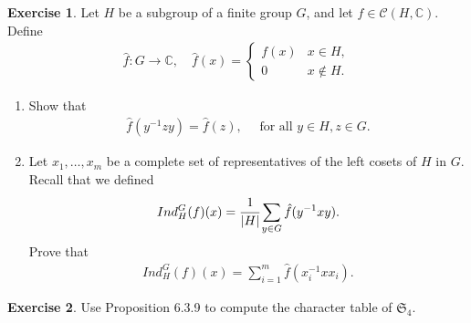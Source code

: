 \documentclass[8pt]{extarticle}
\newcommand{\abs}[1]{|#1|}
\newcommand{\C}{\mathbb{C}}
\newcommand{\<}{\langle}
\renewcommand{\>}{\rangle}
\theoremstyle{definition}
\newtheorem{exercise}{Exercise}
\begin{document}
\begin{exercise}
  Let $H$ be a subgroup of a finite group $G$, and let $f \in \mathcal{C}(H,\C)$. Define
  \begin{align*}
    \hat f : G \to \C, \quad \hat f (x) = 
    \begin{cases}
      f(x) & x \in H, \\
      0 & x \not \in H. 
    \end{cases}
  \end{align*}
  \begin{enumerate}
  \item
    Show that
    \begin{align*}
      \hat f (y^{-1} z y) = \hat f (z), \quad \text{ for all } y \in H, z \in G. 
    \end{align*}
  \item
    Let $x_1, \dots, x_m$ be a complete set of representatives of the left cosets of $H$ in $G$. Recall that we defined
    \begin{align*}
      Ind_H^G(f)(x) = \cfrac{1}{\abs{H}} \sum\limits_{y \in G} \hat f (y^{-1}xy).
    \end{align*}
    Prove that
    \begin{align*}
      Ind_H^G(f)(x) = \sum\limits_{i=1}^m \hat f (x_i^{-1}xx_i).      
    \end{align*}
  \end{enumerate}
\end{exercise}

\begin{exercise}
  Use Proposition 6.3.9 to compute the character table of $\mathfrak{S}_4$.
\end{exercise}
\end{document}
